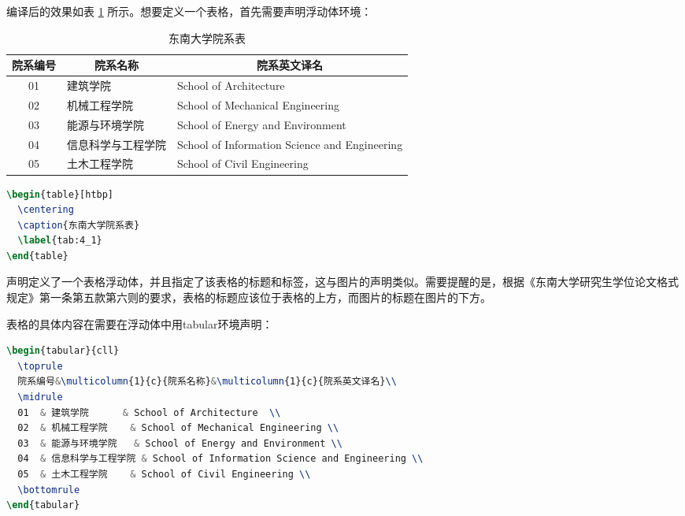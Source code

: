 \noindent 编译后的效果如表 \ref{tab:4_1} 所示。想要定义一个表格，首先需要声明浮动体环境：

\begin{table}[htbp]
\centering
\caption{东南大学院系表}
\label{tab:4_1}
\begin{tabular}{cll}
\toprule
院系编号 & \multicolumn{1}{c}{院系名称}       & \multicolumn{1}{c}{院系英文译名 }     \\
\midrule
01                       & 建筑学院      & School of Architecture                        \\
02                       & 机械工程学院    & School of Mechanical Engineering              \\
03                       & 能源与环境学院   & School of Energy and Environment              \\
04                       & 信息科学与工程学院 & School of Information Science and Engineering \\
05                       & 土木工程学院    & School of Civil Engineering \\
\bottomrule
\end{tabular}
\end{table}

\begin{tcolorbox}
\begin{lstlisting}[language=TeX]
\begin{table}[htbp]
  \centering
  \caption{东南大学院系表}
  \label{tab:4_1}
\end{table}
\end{lstlisting}
\end{tcolorbox}

\noindent 声明定义了一个表格浮动体，并且指定了该表格的标题和标签，这与图片的声明类似。需要提醒的是，根据《东南大学研究生学位论文格式规定》\cite{seugs2015rule}第一条第五款第六则的要求，表格的标题应该位于表格的上方，而图片的标题在图片的下方。

表格的具体内容在需要在浮动体中用{\codefont tabular}环境声明：

\begin{tcolorbox}
\begin{lstlisting}[language=TeX]
\begin{tabular}{cll}
  \toprule
  院系编号&\multicolumn{1}{c}{院系名称}&\multicolumn{1}{c}{院系英文译名}\\
  \midrule
  01  & 建筑学院      & School of Architecture  \\
  02  & 机械工程学院    & School of Mechanical Engineering \\
  03  & 能源与环境学院   & School of Energy and Environment \\
  04  & 信息科学与工程学院 & School of Information Science and Engineering \\
  05  & 土木工程学院    & School of Civil Engineering \\
  \bottomrule
\end{tabular}
\end{lstlisting}
\end{tcolorbox}

